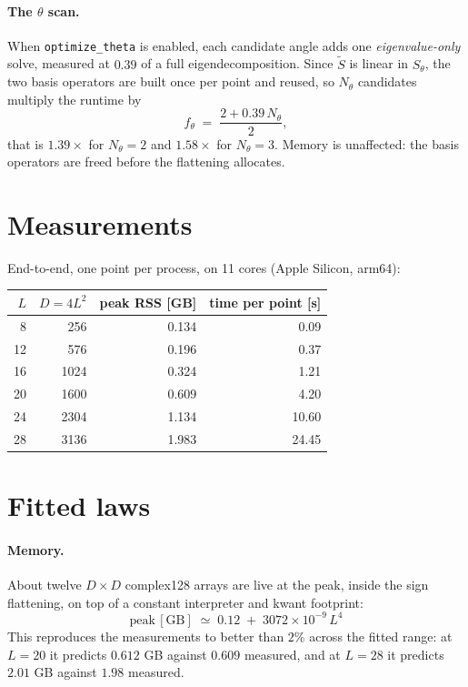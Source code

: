 \documentclass[11pt,a4paper]{article}
\begin{document}
\paragraph{The $\theta$ scan.} When \texttt{optimize\_theta} is enabled, each candidate angle
adds one \emph{eigenvalue-only} solve, measured at $0.39$ of a full eigendecomposition. Since
$\widetilde{S}$ is linear in $S_\theta$, the two basis operators are built once per point and
reused, so $N_\theta$ candidates multiply the runtime by
\begin{equation}
  f_\theta \;=\; \frac{2 + 0.39\,N_\theta}{2} ,
  \label{eq:thetafactor}
\end{equation}
that is $1.39\times$ for $N_\theta=2$ and $1.58\times$ for $N_\theta=3$. Memory is unaffected:
the basis operators are freed before the flattening allocates.

\section{Measurements}

End-to-end, one point per process, on 11 cores (Apple Silicon, arm64):

\begin{center}
\begin{tabular}{@{}rrrr@{}}
\toprule
$L$ & $D = 4L^2$ & peak RSS [GB] & time per point [s] \\
\midrule
 8 &  256 & 0.134 &  0.09 \\
12 &  576 & 0.196 &  0.37 \\
16 & 1024 & 0.324 &  1.21 \\
20 & 1600 & 0.609 &  4.20 \\
24 & 2304 & 1.134 & 10.60 \\
28 & 3136 & 1.983 & 24.45 \\
\bottomrule
\end{tabular}
\end{center}

\section{Fitted laws}

\paragraph{Memory.} About twelve $D\times D$ complex128 arrays are live at the peak, inside
the sign flattening, on top of a constant interpreter and kwant footprint:
\begin{equation}
  \boxed{\;\text{peak}\,[\mathrm{GB}] \;\simeq\; 0.12 \;+\; 3072\times10^{-9}\,L^4\;}
  \label{eq:mem}
\end{equation}
This reproduces the measurements to better than $2\%$ across the fitted range: at $L=20$ it
predicts $0.612$ GB against $0.609$ measured, and at $L=28$ it predicts $2.01$ GB against
$1.98$ measured.
\end{document}
